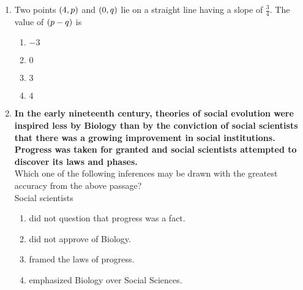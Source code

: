 \documentclass[journal,12pt,twocolumn]{IEEEtran}
\theoremstyle{remark}
\begin{document}
\begin{enumerate}[start=53]
    \item Two points $\left(4, p\right)$ and $\left(0, q\right)$ lie on a straight line having a slope of $\frac{3}{4}$. The value of $\left(p - q\right)$ is
    \begin{enumerate}
        \item $-3$
        \item $0$
        \item $3$
        \item $4$
    \end{enumerate}

    \item \textbf{In the early nineteenth century, theories of social evolution were inspired less by Biology than by the conviction of social scientists that there was a growing improvement in social institutions. Progress was taken for granted and social scientists attempted to discover its laws and phases.} \\
    Which one of the following inferences may be drawn with the greatest accuracy from the above passage? \\
    Social scientists
    \begin{enumerate}
        \item did not question that progress was a fact.
        \item did not approve of Biology.
        \item framed the laws of progress.
        \item emphasized Biology over Social Sciences.
    \end{enumerate}



 
\end{enumerate}
\end{document}
